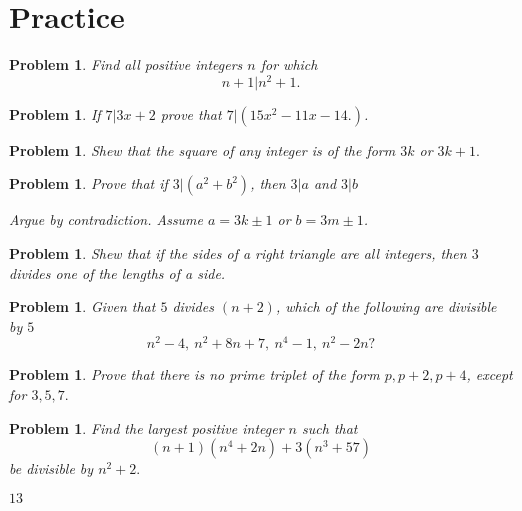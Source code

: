 \documentclass[11pt, openany]{book}
\theoremstyle{change} \theoremheaderfont{\blue\sffamily\bfseries}
\newtheorem{pro}[thm]{Problem}
\theoremstyle{nonumberplain} \theoremheaderfont{\sffamily\bfseries}
\newcommand{\í}{\'{\i}}
\begin{document}
\section*{Practice}
\begin{multicols}{2}\columnseprule 1pt \columnsep 25pt
\begin{pro}  Find all positive integers $n$ for which $$ n + 1|n^2 + 1.$$ \end{pro}
\begin{pro}If $7|3x + 2$ prove that $7|(15x^2 - 11x -14.)$.\end{pro}
\begin{pro}
Shew that the square of any integer is of the form $3k$ or $3k +
1.$
\end{pro}
\begin{pro} Prove that if $3|(a^2 + b^2 )$, then $3|a$ and $3|b$
\begin{answer}
Argue by contradiction. Assume $a = 3k \pm 1$ or $b = 3m \pm 1$.
\end{answer}

\end{pro}
\begin{pro}
Shew that if the sides of a right triangle are all integers, then
$3$ divides one of the lengths of a side.
\end{pro}
\begin{pro} Given that $5$ divides $(n + 2)$, which of the following are
divisible by $5$
$$ n^2 - 4, \ n^2 + 8n + 7, \ n^4 - 1, \ n^2 - 2n ?$$\end{pro}
\begin{pro} Prove that there is no prime triplet of the form $p, p
+ 2, p + 4$, except for $3, 5, 7.$\end{pro}
\begin{pro}
Find the largest positive integer $n$ such that
$$(n + 1)(n^4 + 2n) + 3(n^3 + 57)$$be divisible by $n^2 + 2.$
\begin{answer}
 $13$
\end{answer}
\end{pro}


\end{multicols}
\end{document}
